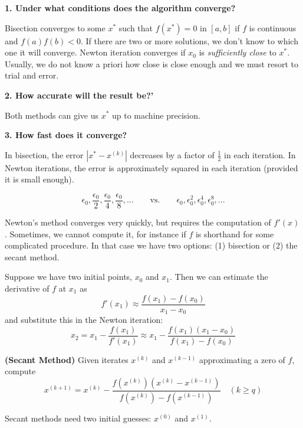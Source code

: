 \documentclass{article}
\newenvironment{theorem}
	{\definecolor{shadethmcolor}{HTML}{EDF8FF}\definecolor{shaderulecolor}{HTML}{45CFFF}\setlength{\shadeboxrule}{.4pt}\begin{prototheorem}\normalfont}
	{\end{prototheorem}}
\newenvironment{remark}
	{\definecolor{shadethmcolor}{HTML}{DFD4FF}\definecolor{shaderulecolor}{HTML}{713DFF}\setlength{\shadeboxrule}{.4pt}\begin{protoremark}\normalfont}
	{\end{protoremark}}
\begin{document}
\textbf{1. Under what conditions does the algorithm converge?}

Bisection converges to some $x^*$ such that $f(x^*)=0$ in $[a,b]$ if $f$ is continuous and $f(a)f(b) < 0$. If there are two or more solutions, we don't know to which one it will converge. 
Newton iteration converges if $x_0$ is \textit{sufficiently close} to $x^*$. Usually, we do not know a priori how close is close enough and we must resort to trial and error. 
\vspace{1in}

\textbf{2. How accurate will the result be?'}

Both methods can give us $x^*$ up to machine precision.
\vspace{1in}

\textbf{3. How fast does it converge?}

In bisection, the error $|x^*-x^{(k)}|$ decreases by a factor of $\frac{1}{2}$ in each iteration. In Newton iterations, the error is approximately squared in each iteration (provided it is small enough). 

\[
\epsilon_0, \frac{\epsilon_0}{2}, \frac{\epsilon_0}{4}, \frac{\epsilon_0}{8},...\qquad\text{vs.}\qquad\epsilon_0, \epsilon_0^2, \epsilon_0^4, \epsilon_0^8,...
\]

Newton's method converges very quickly, but requires the computation of $f'(x)$. Sometimes, we cannot compute it, for instance if $f$ is shorthand for some complicated procedure. In that case we have two options: (1) bisection or (2) the secant method. 
\vspace{1in}

\begin{remark}
Suppose we have two initial points, $x_0$ and $x_1$. Then we can estimate the derivative of $f$ at $x_1$ as
\[
	f'(x_1)\approx\frac{f(x_1)-f(x_0)}{x_1-x_0}
\]
and substitute this in the Newton iteration:
\[
	x_2=x_1-\frac{f(x_1)}{f'(x_1)}\approx x_1-\frac{f(x_1)(x_1-x_0)}{f(x_1)-f(x_0)}
\]
\end{remark}
\clearpage
\begin{theorem}
\textbf{(Secant Method) } Given iterates $x^{(k)}$ and $x^{(k-1)}$ approximating a zero of $f$, compute
\[
\boxed{
	x^{(k+1)}=x^{(k)}-\frac{f(x^{(k)})(x^{(k)}-x^{(k-1)})}{f(x^{(k)})-f(x^{(k-1)})}
}
\quad (k\geq q)
\]

Secant methods need two initial guesses: $x^{(0)}$ and $x^{(1)}$. 
\end{theorem}
\vspace{0.5in}
\end{document}
